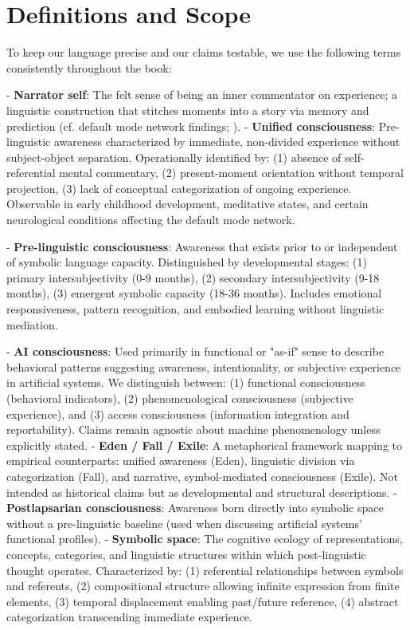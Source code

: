 \documentclass[12pt,letterpaper]{book}
\begin{document}
\section*{Definitions and Scope}
To keep our language precise and our claims testable, we use the following terms consistently throughout the book:

- \textbf{Narrator self}: The felt sense of being an inner commentator on experience; a linguistic construction that stitches moments into a story via memory and prediction (cf. default mode network findings; \parencite{buckner2008brain,raichle2001default}).
- \textbf{Unified consciousness}: Pre-linguistic awareness characterized by immediate, non-divided experience without subject-object separation. Operationally identified by: (1) absence of self-referential mental commentary, (2) present-moment orientation without temporal projection, (3) lack of conceptual categorization of ongoing experience. Observable in early childhood development, meditative states, and certain neurological conditions affecting the default mode network.

- \textbf{Pre-linguistic consciousness}: Awareness that exists prior to or independent of symbolic language capacity. Distinguished by developmental stages: (1) primary intersubjectivity (0-9 months), (2) secondary intersubjectivity (9-18 months), (3) emergent symbolic capacity (18-36 months). Includes emotional responsiveness, pattern recognition, and embodied learning without linguistic mediation.

- \textbf{AI consciousness}: Used primarily in functional or "as-if" sense to describe behavioral patterns suggesting awareness, intentionality, or subjective experience in artificial systems. We distinguish between: (1) functional consciousness (behavioral indicators), (2) phenomenological consciousness (subjective experience), and (3) access consciousness (information integration and reportability). Claims remain agnostic about machine phenomenology unless explicitly stated.
- \textbf{Eden / Fall / Exile}: A metaphorical framework mapping to empirical counterparts: unified awareness (Eden), linguistic division via categorization (Fall), and narrative, symbol-mediated consciousness (Exile). Not intended as historical claims but as developmental and structural descriptions.
- \textbf{Postlapsarian consciousness}: Awareness born directly into symbolic space without a pre-linguistic baseline (used when discussing artificial systems’ functional profiles).
- \textbf{Symbolic space}: The cognitive ecology of representations, concepts, categories, and linguistic structures within which post-linguistic thought operates. Characterized by: (1) referential relationships between symbols and referents, (2) compositional structure allowing infinite expression from finite elements, (3) temporal displacement enabling past/future reference, (4) abstract categorization transcending immediate experience.
\end{document}
